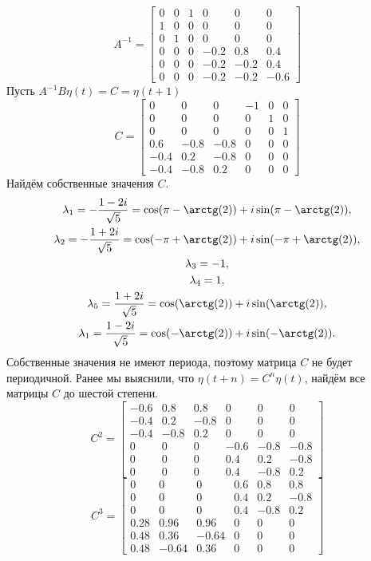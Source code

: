 \documentclass[a4paper, 12pt,fleqn]{extarticle}
\begin{document}
\[A^{-1}=\begin{bmatrix}
0 & 0 & 1 & 0 & 0 & 0\\
1 & 0 & 0 & 0 & 0 & 0\\
0 & 1 & 0 & 0 & 0 & 0\\
0 & 0 & 0 & -0.2 & 0.8 & 0.4\\
0 & 0 & 0 & -0.2 & -0.2 & 0.4\\
0 & 0 & 0 & -0.2 & -0.2 & -0.6
\end{bmatrix}\]
Пусть $A^{-1}B\eta(t)=C=\eta(t+1)$
\[C=\begin{bmatrix}
0& 0& 0& -1& 0& 0\\ 
0& 0& 0& 0& 1& 0\\ 
0& 0& 0& 0& 0& 1\\ 
0.6& -0.8& -0.8& 0& 0& 0\\ 
-0.4& 0.2& -0.8& 0& 0& 0\\ 
-0.4& -0.8& 0.2& 0& 0& 0
\end{bmatrix}\]
Найдём собственные значения $C$.
\begin{gather*}
    \lambda_1 = -\frac{1 - 2 i}{\sqrt{5}}=\cos(\pi - \arctg(2)) + i \sin(\pi - \arctg(2)),\\
    \lambda_2 = -\frac{1 + 2 i}{\sqrt{5}}=\cos(-\pi + \arctg(2)) + i \sin(-\pi + \arctg(2)),\\
    \lambda_3=-1,\\
    \lambda_4=1,\\
    \lambda_5 = \frac{1 + 2 i}{\sqrt{5}}=\cos(\arctg(2)) + i \sin(\arctg(2)),\\
    \lambda_1 = \frac{1 - 2 i}{\sqrt{5}}=\cos(-\arctg(2)) + i \sin(-\arctg(2)).
\end{gather*}
Собственные значения не имеют периода, поэтому матрица $C$ не будет периодичной. Ранее мы выяснили, что $\eta(t+n)=C^n \eta(t)$, найдём все матрицы $C$ до шестой степени.
\[C^2=
\begin{bmatrix}
    -0.6 & 0.8 & 0.8 & 0 & 0 & 0\\
-0.4 & 0.2 & -0.8 & 0 & 0 & 0\\
-0.4 & -0.8 & 0.2 & 0 & 0 & 0\\
0 & 0 & 0 & -0.6 & -0.8 & -0.8\\
0 & 0 & 0 & 0.4 & 0.2 & -0.8\\
0 & 0 & 0 & 0.4 & -0.8 & 0.2
\end{bmatrix}\]
\[C^3=
\begin{bmatrix}
    0 & 0 & 0 & 0.6 & 0.8 & 0.8\\
    0 & 0 & 0 & 0.4 & 0.2 & -0.8\\
    0 & 0 & 0 & 0.4 & -0.8 & 0.2\\
    0.28 & 0.96 & 0.96 & 0 & 0 & 0\\
    0.48 & 0.36 & -0.64 & 0 & 0 & 0\\
    0.48 & -0.64 & 0.36 & 0 & 0 & 0  
\end{bmatrix}\]
\end{document}
